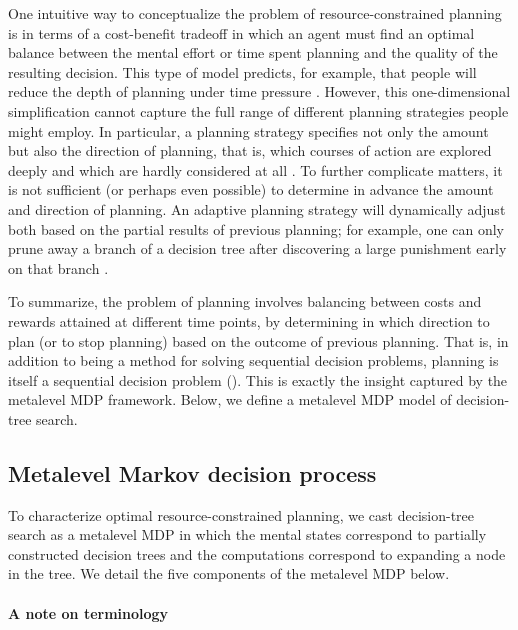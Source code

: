 One intuitive way to conceptualize the problem of resource-constrained planning is in terms of a cost-benefit tradeoff \citep{daw2005uncertaintybased,keramati2011speed,shenhav2013expected,kool2017costbenefit,kool2018mental} in which an agent must find an optimal balance between the mental effort or time spent planning and the quality of the resulting decision. This type of model predicts, for example, that people will reduce the depth of planning under time pressure \citep{keramati2016adaptive}. However, this one-dimensional simplification cannot capture the full range of different planning strategies people might employ. In particular, a planning strategy specifies not only the amount but also the direction of planning, that is, which courses of action are explored deeply and which are hardly considered at all \citep{sezener2019optimizing}. To further complicate matters, it is not sufficient (or perhaps even possible) to determine in advance the amount and direction of planning. An adaptive planning strategy will dynamically adjust both based on the partial results of previous planning; for example, one can only prune away a branch of a decision tree after discovering a large punishment early on that branch \citep{huys2012bonsai}.

To summarize, the problem of planning involves balancing between costs and rewards attained at different time points, by determining in which direction to plan (or to stop planning) based on the outcome of previous planning. That is, in addition to being a method for solving sequential decision problems, planning is itself a sequential decision problem (). This is exactly the insight captured by the metalevel MDP framework. Below, we define a metalevel MDP model of decision-tree search.

\subsection{Metalevel Markov decision process}

To characterize optimal resource-constrained planning, we cast decision-tree search as a metalevel MDP in which the mental states correspond to partially constructed decision trees and the computations correspond to expanding a node in the tree. We detail the five components of the metalevel MDP below.

\paragraph{A note on terminology}

